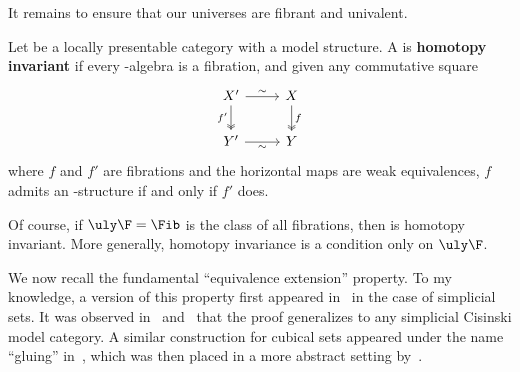 It remains to ensure that our universes are fibrant and univalent.

\begin{defn}\label{defn:nfs-hoinvar}
  Let \E be a locally presentable category with a model structure.
  A \nfs \F is \textbf{homotopy invariant} if every \F-algebra is a fibration, and given any commutative square
  \[
    \begin{tikzcd}
      X' \ar[d,"f'"',two heads] \ar[r,"\sim"] & X \ar[d,"f",two heads]\\
      Y' \ar[r,"\sim"'] & Y
    \end{tikzcd}
  \]
  where $f$ and $f'$ are fibrations and the horizontal maps are weak equivalences, $f$ admits an \F-structure if and only if $f'$ does.
\end{defn}

Of course, if $\uly\F=\Fib$ is the class of all fibrations, then \F is homotopy invariant.
More generally, homotopy invariance is a condition only on $\uly\F$.

We now recall the fundamental ``equivalence extension'' property.
To my knowledge, a version of this property first appeared in~\cite[Theorem 3.4.1]{klv:ssetmodel} in the case of simplicial sets.
It was observed in~\cite[Theorem 3.1]{shulman:elreedy} and~\cite[Remark 2.19]{cisinski:elegant} that the proof generalizes to any simplicial Cisinski model category.
A similar construction for cubical sets appeared under the name ``gluing'' in~\cite{cchm:cubicaltt}, which was then placed in a more abstract setting by~\cite{sattler:eqvext}.

